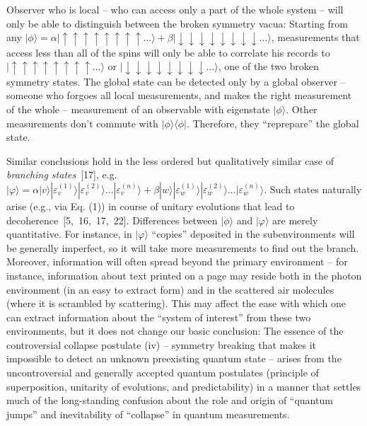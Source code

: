 \documentclass[aps,twocolumn,pra,onecolumn,12pt]{revtex4}
\newcommand{\ket}[1]    {| #1 \rangle}
\newcommand{\kb}[2]     {| #1 \rangle \! \langle #2 |}
\newcommand{\+}         {\dagger}
\begin{document}
Observer who is local -- who can access only a part of the whole system -- will only be able 
to distinguish between the broken symmetry vacua: Starting from any $\ket \phi = \alpha \ket{\uparrow \uparrow \uparrow \uparrow \uparrow \uparrow \uparrow \uparrow \dots} + \beta \ket {\downarrow \downarrow \downarrow \downarrow\downarrow \downarrow\downarrow \downarrow \dots} $, measurements that access less than all of the spins will only be able to correlate 
his records to $\ket{\uparrow \uparrow \uparrow \uparrow \uparrow \uparrow \uparrow \uparrow \dots}$
or $ \ket {\downarrow \downarrow \downarrow \downarrow\downarrow \downarrow\downarrow \downarrow \dots} $,
one of the two broken symmetry states.
The global state can be detected only by a global observer -- someone who forgoes all local measurements, and makes the right measurement of the whole -- measurement of an observable with 
eigenstate $\ket \phi$. Other measurements don't commute with $\kb {\phi }{\phi}$. Therefore, they
``reprepare'' the global state.

Similar conclusions hold in the less ordered but qualitatively similar case of {\it branching states}~[17],
e.g. $\ket \varphi = \alpha \ket v \ket {\varepsilon^{(1)}_v} \ket {\varepsilon^{(2)}_v} \dots \ket {\varepsilon^{(n)}_v} + \beta \ket w \ket {\varepsilon^{(1)}_w} \ket {\varepsilon^{(2)}_w} \dots \ket {\varepsilon^{(n)}_w}$. Such states naturally arise (e.g., via Eq. (1)) in course of unitary evolutions that lead to decoherence~[5,~16,~17,~22].  
Differences between $\ket \phi$ and $\ket \varphi$ are merely quantitative. For instance, in $\ket \varphi$ 
``copies'' deposited in the subenvironments will be generally imperfect, so it will take more 
measurements to find out the branch. Moreover, information will often spread beyond the primary 
environment -- for instance, information about text printed on a page may reside both in the photon 
environment (in an easy to extract form) and in the scattered air molecules (where it is scrambled 
by scattering). This may affect the ease with which one can extract information about 
the ``system of interest'' from these two environments, but it does not change our basic conclusion:
The essence of the controversial collapse postulate (iv) -- symmetry breaking that makes it impossible to detect an unknown preexisting quantum state -- arises from the uncontroversial 
and generally accepted quantum postulates (principle of superposition, unitarity of evolutions, and 
predictability) in a manner that settles much of the long-standing confusion about the role and origin of ``quantum jumps'' and inevitability of ``collapse'' in quantum measurements.
 
\end{document}
